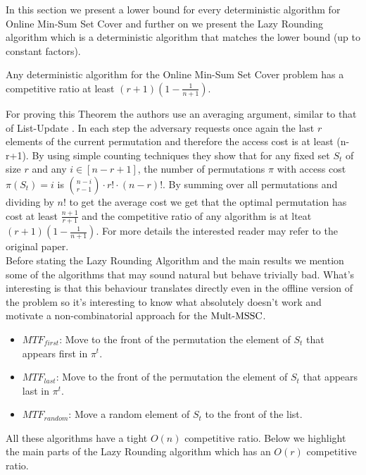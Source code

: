 In this section we present a lower bound for every deterministic algorithm for Online Min-Sum Set Cover and further on we present the Lazy Rounding algorithm which is a deterministic algorithm that matches the lower bound (up to constant factors).

\begin{theorem}
    Any deterministic algorithm for the Online Min-Sum Set Cover problem has a competitive ratio at least $(r+1)(1 - \frac{1}{n+1})$.
\end{theorem}

For proving this Theorem the authors use an averaging argument, similar to that of List-Update \cite{ST85}. In each step the adversary requests once again the last $r$ elements of the current permutation and therefore the access cost is at least (n-r+1). By using simple counting techniques they show that for any fixed set $S_t$ of size $r$ and any $i \in [n-r+1]$, the number of permutations $\pi$ with access cost $\pi(S_t)=i$ is $\binom{n-i}{r-1} \cdot r! \cdot (n-r)!$. By summing over all permutations and dividing by $n!$ to get the average cost we get that the optimal permutation has cost at least $\frac{n+1}{r+1}$ and the competitive ratio of any algorithm is at lteat $(r+1)(1 - \frac{1}{n+1})$. For more details the interested reader may refer to the original paper. \\

Before stating the Lazy Rounding Algorithm and the main results we mention some of the algorithms that may sound natural but behave trivially bad. What's interesting is that this behaviour translates directly even in the offline version of the problem so it's interesting to know what absolutely doesn't work and motivate a non-combinatorial approach for the $\mathrm{Mult}\text{-}\mathrm{MSSC}$.

\begin{itemize}
    \item \textbf{$MTF_{first}$}: Move to the front of the permutation the element of $S_t$ that appears first in $\pi^t$.
    \item \textbf{$MTF_{last}$}: Move to the front of the permutation the element of $S_t$ that appears last in $\pi^t$.
    \item \textbf{$MTF_{random}$}: Move a random element of $S_t$ to the front of the list.
\end{itemize}

All these algorithms have a tight $O(n)$ competitive ratio. Below we highlight the main parts of the Lazy Rounding algorithm which has an $O(r)$ competitive ratio. \\

